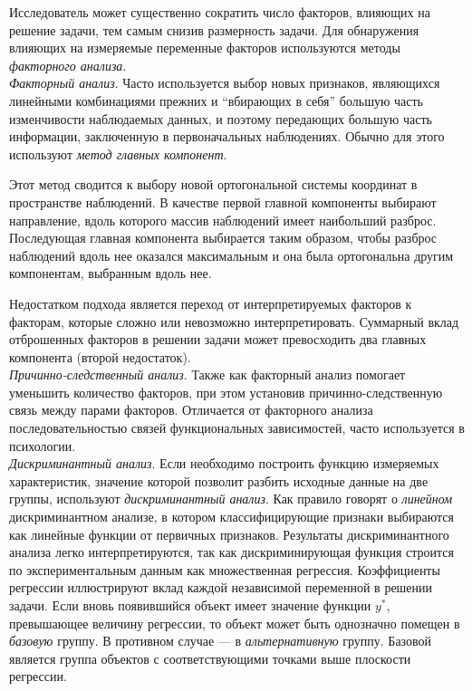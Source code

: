 \documentclass[12pt]{article}
\begin{document}
Исследователь может существенно сократить число факторов, влияющих на решение задачи, тем самым снизив размерность задачи. Для обнаружения влияющих на измеряемые переменные факторов используются методы \emph{факторного анализа}.\\

\emph{Факторный анализ}. Часто используется выбор новых признаков, являющихся линейными комбинациями прежних и \enquote{вбирающих в себя} большую часть изменчивости наблюдаемых данных, и поэтому передающих большую часть информации, заключенную в первоначальных наблюдениях. Обычно для этого используют \emph{метод главных компонент}.

Этот метод сводится к выбору новой ортогональной системы координат в пространстве наблюдений. В качестве первой главной компоненты выбирают направление, вдоль которого массив наблюдений имеет наибольший разброс. Последующая главная компонента выбирается таким образом, чтобы разброс наблюдений вдоль нее оказался максимальным и она была ортогональна другим компонентам, выбранным вдоль нее.

Недостатком подхода является переход от интерпретируемых факторов к факторам, которые сложно или невозможно интерпретировать. Суммарный вклад отброшенных факторов в решении задачи может превосходить два главных компонента (второй недостаток).\\

\emph{Причинно-следственный анализ}. Также как факторный анализ помогает уменьшить количество факторов, при этом установив причинно-следственную связь между парами факторов. Отличается от факторного анализа последовательностью связей функциональных зависимостей, часто используется в психологии.\\
 
\emph{Дискриминантный анализ}. Если необходимо построить функцию измеряемых характеристик, значение которой позволит разбить исходные данные на две группы, используют \emph{дискриминантный анализ}. Как правило говорят о \emph{линейном} дискриминантном анализе, в котором классифицирующие признаки выбираются как линейные функции от первичных признаков. Результаты дискриминантного анализа
легко интерпретируются, так как дискриминирующая функция строится по экспериментальным данным как множественная регрессия. Коэффициенты регрессии иллюстрируют вклад каждой независимой переменной в решении задачи. Если вновь появившийся объект имеет значение функции $y^*$, превышающее величину регрессии, то объект может быть однозначно помещен в \emph{базовую} группу. В противном случае --- в \emph{альтернативную} группу. Базовой является группа объектов с соответствующими точками выше плоскости регрессии.\\
\end{document}
